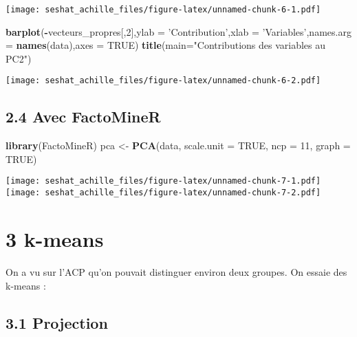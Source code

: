 \documentclass[
]{article}
\newenvironment{Shaded}{\begin{snugshade}}{\end{snugshade}}
\newcommand{\DataTypeTok}[1]{\textcolor[rgb]{0.13,0.29,0.53}{#1}}
\newcommand{\DecValTok}[1]{\textcolor[rgb]{0.00,0.00,0.81}{#1}}
\newcommand{\KeywordTok}[1]{\textcolor[rgb]{0.13,0.29,0.53}{\textbf{#1}}}
\newcommand{\NormalTok}[1]{#1}
\newcommand{\OperatorTok}[1]{\textcolor[rgb]{0.81,0.36,0.00}{\textbf{#1}}}
\newcommand{\OtherTok}[1]{\textcolor[rgb]{0.56,0.35,0.01}{#1}}
\newcommand{\StringTok}[1]{\textcolor[rgb]{0.31,0.60,0.02}{#1}}
\begin{document}
\texttt{[image: seshat\_achille\_files/figure-latex/unnamed-chunk-6-1.pdf]}

\begin{Shaded}
\begin{Highlighting}[]
\KeywordTok{barplot}\NormalTok{(}\OperatorTok{-}\NormalTok{vecteurs_propres[,}\DecValTok{2}\NormalTok{],}\DataTypeTok{ylab =} \StringTok{'Contribution'}\NormalTok{,}\DataTypeTok{xlab =} \StringTok{'Variables'}\NormalTok{,}\DataTypeTok{names.arg =} \KeywordTok{names}\NormalTok{(data),}\DataTypeTok{axes =} \OtherTok{TRUE}\NormalTok{)}
\KeywordTok{title}\NormalTok{(}\DataTypeTok{main=}\StringTok{"Contributions des variables au PC2"}\NormalTok{)}
\end{Highlighting}
\end{Shaded}

\texttt{[image: seshat\_achille\_files/figure-latex/unnamed-chunk-6-2.pdf]}

\hypertarget{avec-factominer}{%
\subsection{2.4 Avec FactoMineR}\label{avec-factominer}}

\begin{Shaded}
\begin{Highlighting}[]
\KeywordTok{library}\NormalTok{(FactoMineR)}
\NormalTok{pca <-}\StringTok{ }\KeywordTok{PCA}\NormalTok{(data, }\DataTypeTok{scale.unit =} \OtherTok{TRUE}\NormalTok{, }\DataTypeTok{ncp =} \DecValTok{11}\NormalTok{, }\DataTypeTok{graph =} \OtherTok{TRUE}\NormalTok{)}
\end{Highlighting}
\end{Shaded}

\texttt{[image: seshat\_achille\_files/figure-latex/unnamed-chunk-7-1.pdf]}
\texttt{[image: seshat\_achille\_files/figure-latex/unnamed-chunk-7-2.pdf]}

\hypertarget{k-means}{%
\section{3 k-means}\label{k-means}}

On a vu sur l'ACP qu'on pouvait distinguer environ deux groupes. On
essaie des k-means :

\hypertarget{projection}{%
\subsection{3.1 Projection}\label{projection}}
\end{document}
